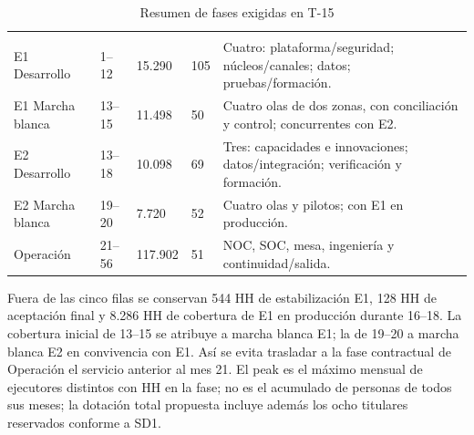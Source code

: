 \begingroup\small\begin{longtable}{L{31mm}L{14mm}R{20mm}R{17mm}L{58mm}}
\caption{Resumen de fases exigidas en T-15}\label{tab:t15-fases-integradas}\\\hline
  &  &  &  & \\\hline\endfirsthead
\hline {} &  &  &  & \\\hline\endhead
E1 Desarrollo & 1--12 & 15.290 & 105 & Cuatro: plataforma/seguridad; núcleos/canales; datos; pruebas/formación.\\\hline
E1 Marcha blanca & 13--15 & 11.498 & 50 & Cuatro olas de dos zonas, con conciliación y control; concurrentes con E2.\\\hline
E2 Desarrollo & 13--18 & 10.098 & 69 & Tres: capacidades e innovaciones; datos/integración; verificación y formación.\\\hline
E2 Marcha blanca & 19--20 & 7.720 & 52 & Cuatro olas y pilotos; con E1 en producción.\\\hline
Operación & 21--56 & 117.902 & 51 & NOC, SOC, mesa, ingeniería y continuidad/salida.\\\hline
\end{longtable}\endgroup
Fuera de las cinco filas se conservan 544 HH de estabilización E1, 128 HH de aceptación final y 8.286 HH de cobertura de E1 en producción durante 16--18. La cobertura inicial de 13--15 se atribuye a marcha blanca E1; la de 19--20 a marcha blanca E2 en convivencia con E1. Así se evita trasladar a la fase contractual de Operación el servicio anterior al mes 21. El peak es el máximo mensual de ejecutores distintos con HH en la fase; no es el acumulado de personas de todos sus meses; la dotación total propuesta incluye además los ocho titulares reservados conforme a SD1.
